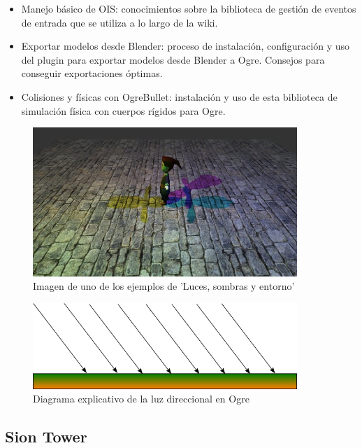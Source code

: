 \documentclass[16pt,spanish]{article}
\begin{document}
\begin{itemize}
    \begin{itemize}
        \item Manejo básico de OIS: conocimientos sobre la biblioteca de
        gestión de eventos de entrada que se utiliza a lo largo de la wiki.
        \item Exportar modelos desde Blender: proceso de instalación, configuración
        y uso del plugin para exportar modelos desde Blender a Ogre. Consejos
        para conseguir exportaciones óptimas.
        \item Colisiones y físicas con OgreBullet: instalación y uso de
        esta biblioteca de simulación física con cuerpos rígidos para Ogre.
    \end{itemize}
\end{itemize}

\begin{figure}[H]
    \centering
        \includegraphics[width=10cm]{img/ejemplo-iberogre.jpg} 
    \caption{Imagen de uno de los ejemplos de 'Luces, sombras y entorno'}
    \label{img:ejemplo-iberogre}
\end{figure}

\begin{figure}[H]
    \centering
        \includegraphics[width=10cm]{img/luz-direccional.png} 
    \caption{Diagrama explicativo de la luz direccional en Ogre}
    \label{img:luz-direccional}
\end{figure}

\subsection{Sion Tower}
\end{document}
